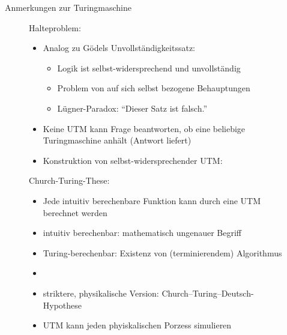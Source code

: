 \documentclass[aspectratio=1610, 9pt]{beamer}
\begin{document}
\begin{frame}{Anmerkungen zur Turingmaschine}
  \begin{figure}
    \begin{minipage}{0.49\textwidth}
      Halteproblem:
      \begin{itemize}
        \item Analog zu Gödels Unvollständigkeitssatz:
        \begin{itemize}
          \item Logik ist selbst-widersprechend und unvollständig
          \item Problem von auf sich selbst bezogene Behauptungen
          \item Lügner-Paradox: \enquote{Dieser Satz ist falsch.}
        \end{itemize}
        \item Keine UTM kann Frage beantworten, ob eine beliebige Turingmaschine anhält (Antwort liefert)
        \item Konstruktion von selbst-widersprechender UTM:
      \end{itemize}
      \begin{algorithm}[H]
      \end{algorithm}
    \end{minipage}
    \hfill
    \begin{minipage}{0.49\textwidth}
      Church-Turing-These:
      \begin{itemize}
        \item Jede intuitiv berechenbare Funktion kann durch eine UTM berechnet werden
        \item intuitiv berechenbar: mathematisch ungenauer Begriff
        \item Turing-berechenbar: Existenz von (terminierendem) Algorithmus
        \item[]
        \item striktere, physikalische Version: Church–Turing–Deutsch-Hypothese
        \item[] UTM kann jeden phyiskalischen Porzess simulieren
      \end{itemize}
    \end{minipage}
  \end{figure}
\end{frame}
\end{document}
